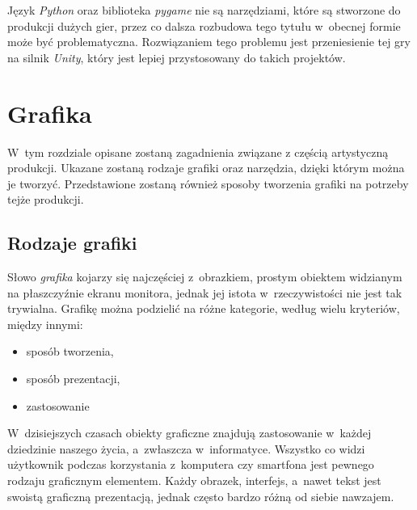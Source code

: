 \documentclass[12pt,a4paper,oneside]{book}
\theoremstyle{definition}
\numberwithin{equation}{chapter}
\begin{document}
\par Język \textit{Python} oraz biblioteka \textit{pygame} nie są narzędziami, które są stworzone do produkcji dużych gier, przez co dalsza rozbudowa tego tytułu w~obecnej formie może być problematyczna. Rozwiązaniem tego problemu jest przeniesienie tej gry na silnik \textit{Unity}, który jest lepiej przystosowany do takich projektów.


\chapter{Grafika}
\par W~tym rozdziale opisane zostaną zagadnienia związane z częścią artystyczną produkcji. Ukazane zostaną rodzaje grafiki oraz narzędzia, dzięki którym można je tworzyć. Przedstawione zostaną również sposoby tworzenia grafiki na potrzeby tejże produkcji.

\section{Rodzaje grafiki}

\par Słowo \textit{grafika} kojarzy się najczęściej z~obrazkiem, prostym obiektem widzianym na płaszczyźnie ekranu monitora, jednak jej istota w~rzeczywistości nie jest tak trywialna. Grafikę można podzielić na różne kategorie, według wielu kryteriów, między innymi:
\begin{itemize}

\item sposób tworzenia,
\item sposób prezentacji,
\item zastosowanie

\end{itemize}

W~dzisiejszych czasach obiekty graficzne znajdują zastosowanie w~każdej dziedzinie naszego życia, a~zwłaszcza w~informatyce. Wszystko co widzi użytkownik podczas korzystania z~komputera czy smartfona jest pewnego rodzaju graficznym elementem. Każdy obrazek, interfejs, a~nawet tekst jest swoistą graficzną prezentacją, jednak często bardzo różną od siebie nawzajem. 
\end{document}
